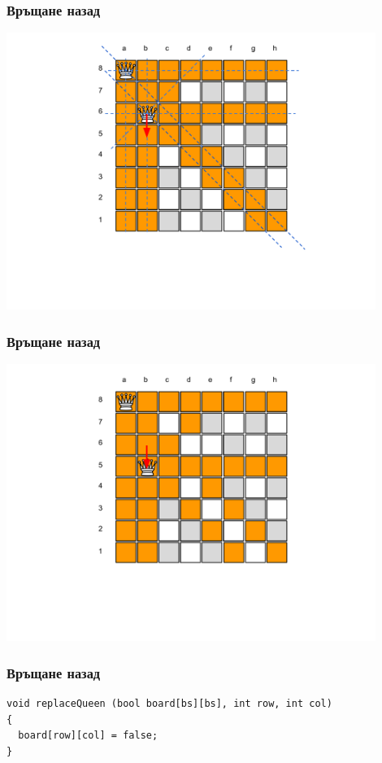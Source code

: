 \documentclass{beamer}
\begin{document}
\begin{frame}[fragile]
\frametitle{Връщане назад}
\begin{center}
\includegraphics[width=12cm]{images/cb_choice_01}
\end{center}
\end{frame}


\begin{frame}[fragile]
\frametitle{Връщане назад}
\begin{center}
\includegraphics[width=12cm]{images/cb_choice_02}
\end{center}
\end{frame}


\begin{frame}[fragile]
\frametitle{Връщане назад}

\begin{lstlisting}
void replaceQueen (bool board[bs][bs], int row, int col)
{
  board[row][col] = false;
}
\end{lstlisting}
\end{frame}
\end{document}
